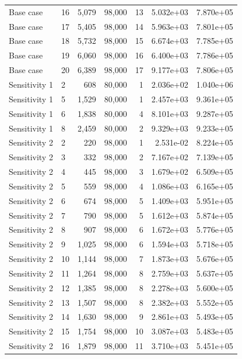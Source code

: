 \begin{xltabular}{\linewidth}{llrrrrr}
  Base case & 16 & 5,079 &  98,000 &   13 & 5.032e+03 & 7.870e+05 \\
  Base case & 17 & 5,405 &  98,000 &   14 & 5.963e+03 & 7.801e+05 \\
  Base case & 18 & 5,732 &  98,000 &   15 & 6.674e+03 & 7.785e+05 \\
  Base case & 19 & 6,060 &  98,000 &   16 & 6.400e+03 & 7.786e+05 \\
  Base case & 20 & 6,389 &  98,000 &   17 & 9.177e+03 & 7.806e+05 \\
 Sensitivity 1 & 2 & 608 &  80,000 &   1 & 2.036e+02 & 1.040e+06 \\
 Sensitivity 1 & 5 & 1,529 &  80,000 &   1 & 2.457e+03 & 9.361e+05 \\
 Sensitivity 1 & 6 & 1,838 &  80,000 &   4 & 8.101e+03 & 9.287e+05 \\
 Sensitivity 1 & 8 & 2,459 &  80,000 &   2 & 9.329e+03 & 9.233e+05 \\
 Sensitivity 2 & 2 & 220 &  98,000 &   1 & 2.531e-02 & 8.224e+05 \\
 Sensitivity 2 & 3 & 332 &  98,000 &   2 & 7.167e+02 & 7.139e+05 \\
 Sensitivity 2 & 4 & 445 &  98,000 &   3 & 1.679e+02 & 6.509e+05 \\
 Sensitivity 2 & 5 & 559 &  98,000 &   4 & 1.086e+03 & 6.165e+05 \\
 Sensitivity 2 & 6 & 674 &  98,000 &   5 & 1.409e+03 & 5.951e+05 \\
 Sensitivity 2 & 7 & 790 &  98,000 &   5 & 1.612e+03 & 5.874e+05 \\
 Sensitivity 2 & 8 & 907 &  98,000 &   6 & 1.672e+03 & 5.776e+05 \\
 Sensitivity 2 & 9 & 1,025 &  98,000 &   6 & 1.594e+03 & 5.718e+05 \\
 Sensitivity 2 & 10 & 1,144 &  98,000 &   7 & 1.873e+03 & 5.676e+05 \\
 Sensitivity 2 & 11 & 1,264 &  98,000 &   8 & 2.759e+03 & 5.637e+05 \\
 Sensitivity 2 & 12 & 1,385 &  98,000 &   8 & 2.278e+03 & 5.600e+05 \\
 Sensitivity 2 & 13 & 1,507 &  98,000 &   8 & 2.382e+03 & 5.552e+05 \\
 Sensitivity 2 & 14 & 1,630 &  98,000 &   9 & 2.861e+03 & 5.493e+05 \\
 Sensitivity 2 & 15 & 1,754 &  98,000 &   10 & 3.087e+03 & 5.483e+05 \\
 Sensitivity 2 & 16 & 1,879 &  98,000 &   11 & 3.710e+03 & 5.451e+05 \\

\end{xltabular}
